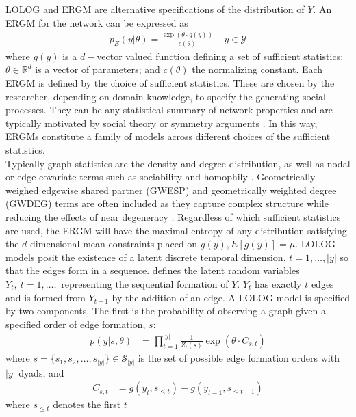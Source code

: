 \documentclass[
]{statsoc}
\begin{document}
LOLOG and ERGM are alternative specifications of the distribution of
\(Y\). An ERGM for the network can be expressed as
\begin{align}\label{eq:ERGM_spec}
p_{E}(y\vert \theta) = \frac{\exp(\theta\cdot g(y))}{c({\theta})}~~~~~ y\in \mathscr{Y}
\end{align} \noindent where \(g(y)\) is a \(d-\)vector valued function
defining a set of sufficient statistics; \(\theta \in \mathds{R}^{d}\)
is a vector of parameters; and \(c(\theta)\) the normalizing constant.
Each ERGM is defined by the choice of sufficient statistics. These are
chosen by the researcher, depending on domain knowledge, to specify the
generating social processes. They can be any statistical summary of
network properties and are typically motivated by social theory
\citep{goodkittsmorris09} or symmetry arguments \citep{str86}. In this
way, ERGMs constitute a family of models across different choices of the
sufficient statistics.\\
Typically graph statistics are the density and degree distribution, as
well as nodal or edge covariate terms such as sociability and homophily
\citep{ergmtermsjss}. Geometrically weighed edgewise shared partner
(GWESP) and geometrically weighted degree (GWDEG) terms are often
included \citep{snijders2006} as they capture complex structure while
reducing the effects of near degeneracy \citep{Handcock2003}. Regardless
of which sufficient statistics are used, the ERGM will have the maximal
entropy of any distribution satisfying the \(d\)-dimensional mean
constraints placed on \(g(y), E[g(y)]=\mu\). LOLOG models posit the
existence of a latent discrete temporal dimension, \(t=1, \ldots, |y|\)
so that the edges form in a sequence. \cite{Fellows2018} defines the
latent random variables \(Y_{t},\ t=1, \ldots,\) representing the
sequential formation of \(Y\). \(Y_{t}\) has exactly \(t\) edges and is
formed from \(Y_{t-1}\) by the addition of an edge. A LOLOG model is
specified by two components, The first is the probability of observing a
graph given a specified order of edge formation, \(s\): \begin{align}
p(y \vert s,\theta) &= \prod_{t=1}^{|y|} \frac{1}{Z_t(s)} \exp\left(\theta\cdot C_{s,t}\right)
\end{align} \noindent where
\(s=\{s_1, s_2, \ldots, s_{|y|}\} \in \mathscr{S}_{|y|}\) is the set of
possible edge formation orders with \(|y|\) dyads, and \begin{align}
C_{s,t} &= g(y_{t},s_{\leq t}) - g(y_{t-1},s_{\leq t-1})
\end{align} \noindent where \(s_{\leq t}\) denotes the first \(t\)
\end{document}
